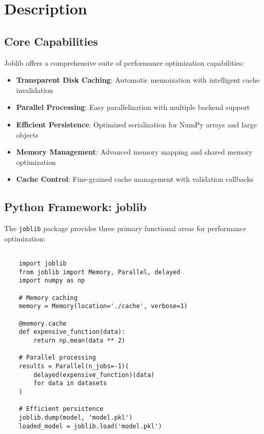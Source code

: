 \section{Description}
\label{sec:description}

\subsection{Core Capabilities}
\label{subsec:capabilities}

Joblib offers a comprehensive suite of performance optimization capabilities:

\begin{itemize}
	\item \textbf{Transparent Disk Caching}: Automatic memoization with intelligent cache invalidation
	\item \textbf{Parallel Processing}: Easy parallelization with multiple backend support
	\item \textbf{Efficient Persistence}: Optimized serialization for NumPy arrays and large objects
	\item \textbf{Memory Management}: Advanced memory mapping and shared memory optimization
	\item \textbf{Cache Control}: Fine-grained cache management with validation callbacks
\end{itemize}

\clearpage

\subsection{Python Framework: joblib}
\label{subsec:joblib}

The \texttt{joblib} package provides three primary functional areas for performance optimization:

\begin{lstlisting}[language=MyPython, caption={Joblib Core Components}, label={lst:joblib_core}]
	
	import joblib
	from joblib import Memory, Parallel, delayed
	import numpy as np
	
	# Memory caching
	memory = Memory(location='./cache', verbose=1)
	
	@memory.cache
	def expensive_function(data):
	    return np.mean(data ** 2)
	
	# Parallel processing
	results = Parallel(n_jobs=-1)(
	    delayed(expensive_function)(data) 
	    for data in datasets
	)
	
	# Efficient persistence
	joblib.dump(model, 'model.pkl')
	loaded_model = joblib.load('model.pkl')
	
\end{lstlisting}


